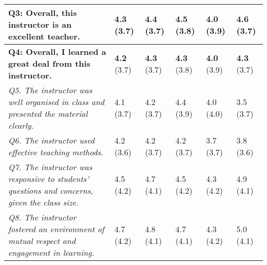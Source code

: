 \documentclass[a4paper,11pt]{article}
\begin{document}
\begin{table}[htbp]
\begin{tabular}{@{}p{8cm}p{1.3cm}p{1.3cm}p{1.3cm}p{1.3cm}p{1.3cm}@{}}
\textbf{Q3: Overall, this instructor is an excellent teacher.} & \textbf{4.3} \newline (3.7) & \textbf{4.4} \newline (3.7)  & 
\textbf{4.5} \newline (3.8)  & \textbf{4.0} \newline (3.9) & \textbf{4.6} \newline (3.7)  \\ \midrule

\textbf{Q4: Overall, I learned a great deal from this instructor.} & \textbf{4.2} \newline (3.7) & \textbf{4.3} \newline (3.7)  & 
\textbf{4.3} \newline (3.8) & \textbf{4.0} \newline (3.9) & \textbf{4.3} \newline (3.7) \\ \midrule

\emph{Q5. The instructor was well organised in class and presented the material clearly.} & 4.1 \newline (3.7)  & 4.2 \newline (3.7)  & 4.4 \newline (3.9)  & 4.0 \newline (4.0) & 3.5 \newline (3.7) \\ \midrule

\emph{Q6. The instructor used effective teaching methods.} & 4.2 \newline (3.6)  & 4.2 \newline (3.7) & 
4.2 \newline (3.7)  & 3.7 \newline (3.7)  & 3.8 \newline (3.6) \\ \midrule

\emph{Q7. The instructor was responsive to students’ questions and concerns, given the class size.} & 4.5 \newline (4.2)  & 4.7 \newline (4.1) & 4.5 \newline (4.2)  & 4.3 \newline (4.2) & 4.9 \newline (4.1)  \\ \midrule

\emph{Q8. The instructor fostered an environment of mutual respect and engagement in learning.} & 4.7 \newline (4.2)  & 4.8 \newline (4.1) & 4.7 \newline (4.1)  & 4.3 \newline (4.2) & 5.0 \newline (4.1)  \\ \midrule


\end{tabular}
\end{table}
\end{document}
